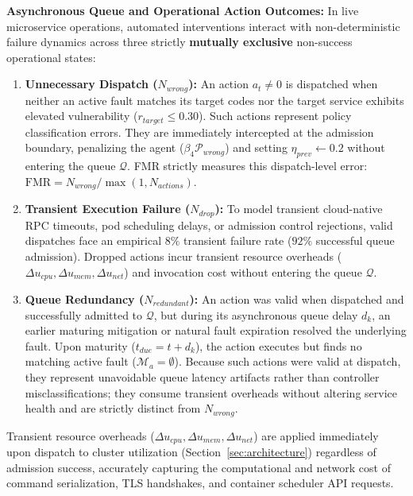 \documentclass[ASNA,twocolumn]{USG}
\begin{document}
\textbf{Asynchronous Queue and Operational Action Outcomes:} In live microservice operations, automated interventions interact with non-deterministic failure dynamics across three strictly \textbf{mutually exclusive} non-success operational states:
\begin{enumerate}
    \item \textbf{Unnecessary Dispatch ($N_{wrong}$):} An action $a_t \ne 0$ is dispatched when neither an active fault matches its target codes nor the target service exhibits elevated vulnerability ($r_{target} \le 0.30$). Such actions represent policy classification errors. They are immediately intercepted at the admission boundary, penalizing the agent ($\beta_4 \mathcal{P}_{wrong}$) and setting $\eta_{prev} \leftarrow 0.2$ without entering the queue $\mathcal{Q}$. FMR strictly measures this dispatch-level error: $\text{FMR} = N_{wrong} / \max(1, N_{actions})$.
    \item \textbf{Transient Execution Failure ($N_{drop}$):} To model transient cloud-native RPC timeouts, pod scheduling delays, or admission control rejections, valid dispatches face an empirical $8\%$ transient failure rate ($92\%$ successful queue admission). Dropped actions incur transient resource overheads ($\Delta u_{cpu}, \Delta u_{mem}, \Delta u_{net}$) and invocation cost without entering the queue $\mathcal{Q}$.
    \item \textbf{Queue Redundancy ($N_{redundant}$):} An action was valid when dispatched and successfully admitted to $\mathcal{Q}$, but during its asynchronous queue delay $d_k$, an earlier maturing mitigation or natural fault expiration resolved the underlying fault. Upon maturity ($t_{due} = t + d_k$), the action executes but finds no matching active fault ($\mathcal{M}_a = \emptyset$). Because such actions were valid at dispatch, they represent unavoidable queue latency artifacts rather than controller misclassifications; they consume transient overheads without altering service health and are strictly distinct from $N_{wrong}$.
\end{enumerate}
Transient resource overheads ($\Delta u_{cpu}, \Delta u_{mem}, \Delta u_{net}$) are applied immediately upon dispatch to cluster utilization (Section~\ref{sec:architecture}) regardless of admission success, accurately capturing the computational and network cost of command serialization, TLS handshakes, and container scheduler API requests.
\end{document}
